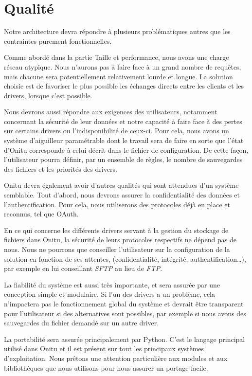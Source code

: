 \chapter{Qualité}
\thispagestyle{EIP} %

Notre architecture devra répondre à plusieurs problématiques autres que les contraintes purement fonctionnelles.

Comme abordé dans la partie Taille et performance, nous avons une charge réseau atypique. Nous n'aurons pas à faire face à un grand nombre de requêtes, mais chacune sera potentiellement relativement lourde et longue. La solution choisie est de favoriser le plus possible les échanges directs entre les clients et les drivers, lorsque c'est possible.

Nous devrons aussi répondre aux exigences des utilisateurs, notamment concernant la sécurité de leur données et notre capacité à faire face à des pertes sur certains drivers ou l'indisponibilité de ceux-ci. Pour cela, nous avons un système d'aiguilleur paramétrable dont le travail sera de faire en sorte que l'état d'Onitu corresponde à celui décrit dans le fichier de configuration. De cette façon, l'utilisateur pourra définir, par un ensemble de règles, le nombre de sauvegardes des fichiers et les priorités des drivers.

Onitu devra également avoir d'autres qualités qui sont attendues d'un système semblable. Tout d'abord, nous devrons assurer la confidentialité des données et l'authentification. Pour cela, nous utiliserons des protocoles déjà en place et reconnus, tel que OAuth.

En ce qui concerne les différents drivers servant à la gestion du stockage de fichiers dans  Onitu, la sécurité de leurs protocoles respectifs ne dépend pas de nous. Nous ne pourrons que conseiller l'utilisateur sur la configuration de la solution en fonction de ses attentes, (confidentialité, intégrité, authentification…), par exemple en lui conseillant \textit{SFTP} au lieu de \textit{FTP}.

La fiabilité du système est aussi très importante, et sera assurée par une conception simple et modulaire. Si l'un des drivers a un problème, cela n'impactera pas le fonctionnement global du système et devrait être transparent pour l'utilisateur si des alternatives sont possibles, par exemple si nous avons des sauvegardes du fichier demandé sur un autre driver.

La portabilité sera assurée principalement par Python. C'est le langage principal utilisé dans Onitu et il est présent sur tout les principaux systèmes d'exploitation. Nous prêtons une attention particulière aux modules et aux bibliothèques que nous utilisons pour nous assurer un portage facile.

